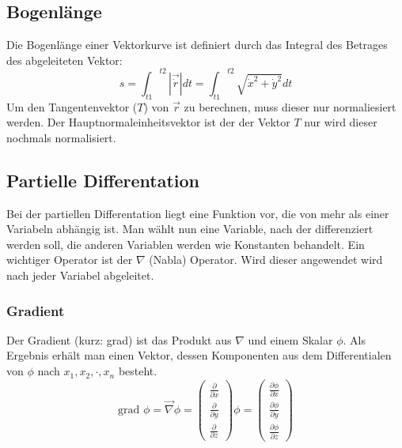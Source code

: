 \documentclass[a4paper,10pt]{scrartcl}
\begin{document}
        \subsection*{Bogenlänge}
        Die Bogenlänge einer Vektorkurve ist definiert durch das Integral des Betrages des abgeleiteten Vektor:
        \begin{equation*}
            s = {\int_{t1}}^{t2} | \vec{\dot{r}} | dt = {\int_{t1}}^{t2}  \sqrt{{\dot{x}}^2 +{\dot{y}}^2} dt 
        \end{equation*} 
        Um den Tangentenvektor (\(T\)) von \(\vec{r}\) zu berechnen, muss dieser nur normaliesiert werden. Der Hauptnormaleinheitsvektor ist der der 
        Vektor \(T\) nur wird dieser nochmals normalisiert.
    \subsection{Partielle Differentation}
        Bei der partiellen Differentation liegt eine Funktion vor, die von mehr als einer Variabeln abhängig ist. Man wählt nun eine Variable, nach der differenziert
        werden soll, die anderen Variablen werden wie Konstanten behandelt. Ein wichtiger Operator ist der \(\nabla\) (Nabla) Operator. Wird dieser angewendet wird nach jeder 
        Variabel abgeleitet.
        \subsubsection{Gradient}
        Der Gradient (kurz: grad) ist das Produkt aus \(\nabla\) und einem Skalar \(\phi\). Als Ergebnis erhält man einen Vektor, dessen Komponenten aus dem Differentialen 
        von \(\phi\) nach \(x_1, x_2,\cdot,x_n\) besteht. 
        \begin{equation*}
            \text{grad } \phi = \vec{\nabla} \phi = \begin{pmatrix} \frac{\partial}{\partial x} \\ \frac{\partial}{\partial y} \\ \frac{\partial}{\partial z} \end{pmatrix} \phi = 
            \begin{pmatrix} \frac{\partial \phi}{\partial x} \\ \frac{\partial \phi}{\partial y} \\ \frac{\partial \phi}{\partial z} \end{pmatrix} 
        \end{equation*}
\end{document}
